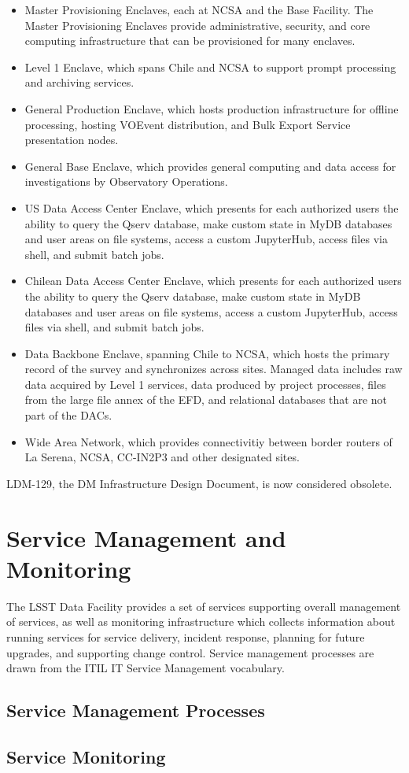 \begin{itemize}
\item  Master Provisioning Enclaves, each at NCSA and the Base Facility. The 
Master Provisioning Enclaves provide administrative, security, and core computing 
infrastructure that can be provisioned for many enclaves.
\item  Level 1 Enclave, which spans Chile and NCSA to support prompt processing 
and archiving services.
\item  General Production Enclave, which hosts production infrastructure for 
offline processing, hosting VOEvent distribution, and Bulk Export Service 
presentation nodes.
\item  General Base Enclave, which provides general computing and data access for 
investigations by Observatory Operations.
\item  US Data Access Center Enclave, which presents for each authorized users 
the ability to query the Qserv database, make custom state in MyDB databases and 
user areas on file systems, access a custom JupyterHub, access files via shell, 
and submit batch jobs. 
\item  Chilean Data Access Center Enclave, which presents for each authorized 
users the ability to query the Qserv database, make custom state in MyDB 
databases and user areas on file systems, access a custom JupyterHub, access 
files via shell, and submit batch jobs.
\item  Data Backbone Enclave, spanning Chile to NCSA, which hosts the primary 
record of the survey and synchronizes across sites. Managed data includes raw 
data acquired by Level 1 services, data produced by project processes, files from 
the large file annex of the EFD, and relational databases that are not part of the 
DACs.
\item  Wide Area Network, which provides connectivitiy between border routers of 
La Serena, NCSA, CC-IN2P3 and other designated sites.
\end{itemize}

LDM-129, the DM Infrastructure Design Document, is now considered obsolete.

\section{Service Management and Monitoring}

The LSST Data Facility provides a set of services supporting overall management of services, as well as monitoring infrastructure which collects information about running services for service delivery, incident response, planning for future upgrades, and supporting change control. Service management processes are drawn from the ITIL IT Service Management vocabulary.

\subsection{Service Management Processes}


\subsection{Service Monitoring}
